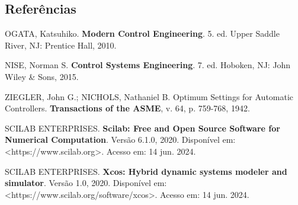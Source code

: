 \begin{titlepage}

    \section{Referências}

    \vspace{0.5cm} %

    \noindent OGATA, Katsuhiko. \textbf{Modern Control Engineering}. 5. ed. Upper Saddle River, NJ: Prentice Hall, 2010.

    \noindent NISE, Norman S. \textbf{Control Systems Engineering}. 7. ed. Hoboken, NJ: John Wiley \& Sons, 2015.

    \noindent ZIEGLER, John G.; NICHOLS, Nathaniel B. Optimum Settings for Automatic Controllers. \textbf{Transactions of the ASME}, v. 64, p. 759-768, 1942.

    \noindent SCILAB ENTERPRISES. \textbf{Scilab: Free and Open Source Software for Numerical Computation}. Versão 6.1.0, 2020. Disponível em: <https://www.scilab.org>. Acesso em: 14 jun. 2024.

    \noindent SCILAB ENTERPRISES. \textbf{Xcos: Hybrid dynamic systems modeler and simulator}. Versão 1.0, 2020. Disponível em: <https://www.scilab.org/software/xcos>. Acesso em: 14 jun. 2024.

\end{titlepage}
